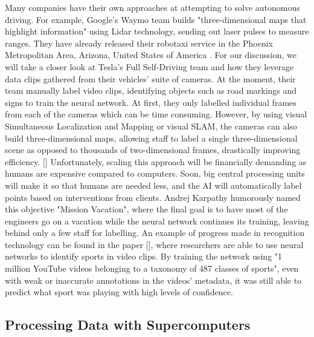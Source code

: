 \documentclass{article}
\begin{document}
Many companies have their own approaches at attempting to solve autonomous driving. For example, Google's Waymo team builds "three-dimensional maps that highlight information" using Lidar technology, sending out laser pulses to measure ranges. They have already released their robotaxi service in the Phoenix Metropolitan Area, Arizona, United States of America \textcite{waymo}. For our discussion, we will take a closer look at Tesla's Full Self-Driving team and how they leverage data clips gathered from their vehicles' suite of cameras. At the moment, their team manually label video clips, identifying objects such as road markings and signs to train the neural network. At first, they only labelled individual frames from each of the cameras which can be time consuming. However, by using visual Simultaneous Localization and Mapping or visual SLAM, the cameras can also build three-dimensional maps, allowing staff to label a single three-dimensional scene as opposed to thousands of two-dimensional frames, drastically improving efficiency. [\textcite{durrant2006simultaneous}]
\bigbreak
Unfortunately, scaling this approach will be financially demanding as humans are expensive compared to computers. Soon, big central processing units will make it so that humans are needed less, and the AI will automatically label points based on interventions from clients. Andrej Karpathy humorously named this objective "Mission Vacation", where the final goal is to have most of the engineers go on a vacation while the neural network continues its training, leaving behind only a few staff for labelling. An example of progress made in recognition technology can be found in the paper [\textcite{karpathy2014large}], where researchers are able to use neural networks to identify sports in video clips. By training the network using "1 million YouTube videos belonging to a taxonomy of 487 classes of sports", even with weak or inaccurate annotations in the videos' metadata, it was still able to predict what sport was playing with high levels of confidence.

\subsection{Processing Data with Supercomputers}
\end{document}
